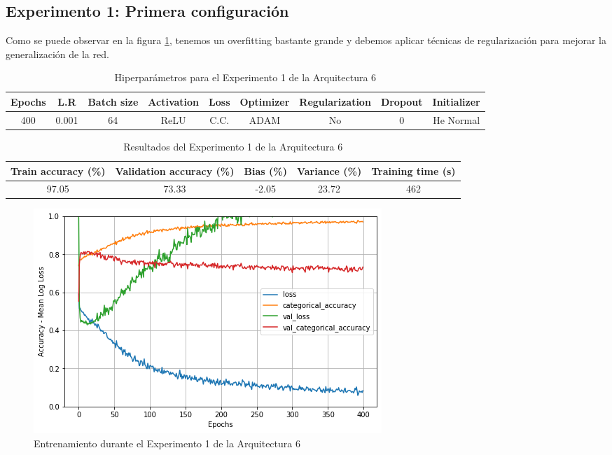 \documentclass{article}
\begin{document}
		\subsection{Experimento 1: Primera configuraci\'on}
        \label{b-s-a6-e1}
            Como se puede observar en la figura \ref{b-tr-a6-e1}, tenemos un overfitting bastante grande y debemos aplicar t\'ecnicas de regularizaci\'on para mejorar la generalizaci\'on de la red. 
            \begin{table}[!h]
				\begin{tabular}{|c|c|c|c|c|c|c|c|c|}
					\textbf{Epochs}&\textbf{L.R}&\textbf{Batch size}&\textbf{Activation}&\textbf{Loss}&\textbf{Optimizer}&\textbf{Regularization}&\textbf{Dropout}  & \textbf{Initializer} \\ \hline
					400 & 0.001 & 64 & ReLU & C.C. & ADAM & No & 0 & He Normal
				\end{tabular}
				\caption{Hiperpar\'ametros para el Experimento 1 de la Arquitectura 6}
				\label{tab:hip-b-a6-e1}
			\end{table}
   
            \begin{table}[!h]
				\begin{center}
					\begin{tabular}{| c | c | c | c | c |}
						\textbf{Train accuracy (\%)} & \textbf{Validation accuracy (\%)} & \textbf{Bias (\%)} & \textbf{Variance (\%)} & \textbf{Training time (s)} \\ \hline
						97.05 & 73.33 & -2.05 & 23.72 & 462 \\ \hline
					\end{tabular}
					\caption{Resultados del Experimento 1 de la Arquitectura 6}
					\label{tab:res-b-a6-e1}
				\end{center}
			\end{table}
            
            \begin{figure}[!h]
				\begin{center}
					\includegraphics[scale=0.5]{b-tr-a6-e1.png}		
					\caption{Entrenamiento durante el Experimento 1 de la Arquitectura 6}	
					\label{b-tr-a6-e1}
				\end{center}
			\end{figure}
   
\end{document}

